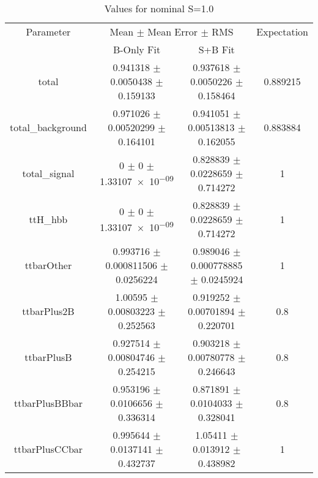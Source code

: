 \begin{table}
\centering
\caption{Values for nominal S=1.0}
\begin{tabular}{cccc}
\toprule
Parameter & \multicolumn{2}{c}{Mean $\pm$ Mean Error $\pm$ RMS} & Expectation\\
 & B-Only Fit & S+B Fit & \\
\midrule
total & \num{0.941318} $\pm$ \num{0.0050438} $\pm$ \num{0.159133} & \num{0.937618} $\pm$ \num{0.0050226} $\pm$ \num{0.158464} & \num{0.889215}\\
total\_background & \num{0.971026} $\pm$ \num{0.00520299} $\pm$ \num{0.164101} & \num{0.941051} $\pm$ \num{0.00513813} $\pm$ \num{0.162055} & \num{0.883884}\\
total\_signal & \num{0} $\pm$ \num{0} $\pm$ \num{1.33107e-09} & \num{0.828839} $\pm$ \num{0.0228659} $\pm$ \num{0.714272} & \num{1}\\
ttH\_hbb & \num{0} $\pm$ \num{0} $\pm$ \num{1.33107e-09} & \num{0.828839} $\pm$ \num{0.0228659} $\pm$ \num{0.714272} & \num{1}\\
ttbarOther & \num{0.993716} $\pm$ \num{0.000811506} $\pm$ \num{0.0256224} & \num{0.989046} $\pm$ \num{0.000778885} $\pm$ \num{0.0245924} & \num{1}\\
ttbarPlus2B & \num{1.00595} $\pm$ \num{0.00803223} $\pm$ \num{0.252563} & \num{0.919252} $\pm$ \num{0.00701894} $\pm$ \num{0.220701} & \num{0.8}\\
ttbarPlusB & \num{0.927514} $\pm$ \num{0.00804746} $\pm$ \num{0.254215} & \num{0.903218} $\pm$ \num{0.00780778} $\pm$ \num{0.246643} & \num{0.8}\\
ttbarPlusBBbar & \num{0.953196} $\pm$ \num{0.0106656} $\pm$ \num{0.336314} & \num{0.871891} $\pm$ \num{0.0104033} $\pm$ \num{0.328041} & \num{0.8}\\
ttbarPlusCCbar & \num{0.995644} $\pm$ \num{0.0137141} $\pm$ \num{0.432737} & \num{1.05411} $\pm$ \num{0.013912} $\pm$ \num{0.438982} & \num{1}\\
\bottomrule
\end{tabular}
\end{table}
